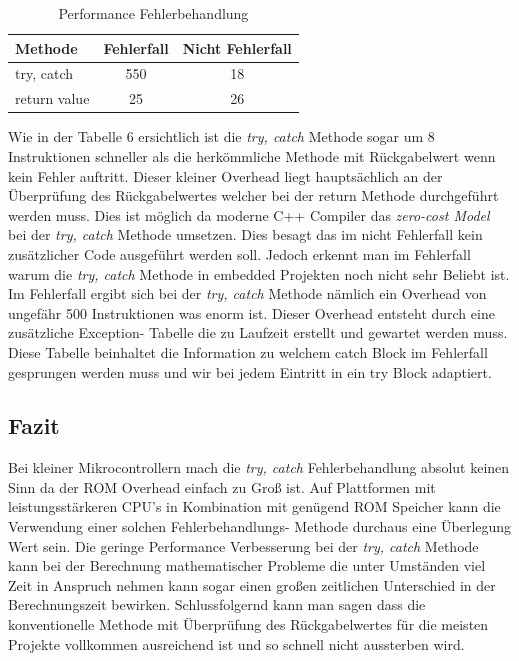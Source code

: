 \documentclass[MES,Master,ngerman]{twbook}%
\begin{document}
\begin{table}[!htb]
	\centering
	\begin{tabular}{| l | c | c |}
		\hline
		\textbf{Methode}   & \textbf{Fehlerfall} & \textbf{Nicht Fehlerfall}   \\ \hline
		try, catch       & 550	& 18		    \\ \hline
		return value           & 25 & 26	    		\\ \hline
		
	\end{tabular}
	
	\caption{Performance Fehlerbehandlung}
	\label{tbl:6}
\end{table}
 Wie in der Tabelle 6 ersichtlich ist die \textit{try, catch} Methode sogar um 8 Instruktionen schneller als die herkömmliche Methode mit Rückgabelwert wenn kein Fehler auftritt. Dieser kleiner Overhead liegt hauptsächlich an der Überprüfung des Rückgabelwertes welcher bei der return Methode durchgeführt werden muss. Dies ist möglich da moderne C++ Compiler das \textit{zero-cost Model} bei der \textit{try, catch} Methode umsetzen. Dies besagt das im nicht Fehlerfall kein zusätzlicher Code ausgeführt werden soll. Jedoch erkennt man im Fehlerfall warum die \textit{try, catch} Methode in embedded Projekten noch nicht sehr Beliebt ist. Im Fehlerfall ergibt sich bei der \textit{try, catch} Methode nämlich ein Overhead von ungefähr 500 Instruktionen was enorm ist. Dieser Overhead entsteht durch eine zusätzliche Exception- Tabelle die zu Laufzeit erstellt und gewartet werden muss. Diese Tabelle beinhaltet die Information zu welchem catch Block im Fehlerfall gesprungen werden muss und wir bei jedem Eintritt in ein try Block adaptiert. 

\newpage
\subsection{Fazit}
Bei kleiner Mikrocontrollern mach die \textit{try, catch} Fehlerbehandlung absolut keinen Sinn da der ROM Overhead einfach zu Groß ist. Auf Plattformen mit leistungsstärkeren CPU's in Kombination mit genügend ROM Speicher kann die Verwendung einer solchen Fehlerbehandlungs- Methode durchaus eine Überlegung Wert sein. Die geringe Performance Verbesserung bei der \textit{try, catch} Methode kann bei der Berechnung mathematischer Probleme die unter Umständen viel Zeit in Anspruch nehmen kann sogar einen großen zeitlichen Unterschied in der Berechnungszeit bewirken. Schlussfolgernd kann man sagen dass die konventionelle Methode mit Überprüfung des Rückgabelwertes für die meisten Projekte vollkommen ausreichend ist und so schnell nicht aussterben wird.
\end{document}
